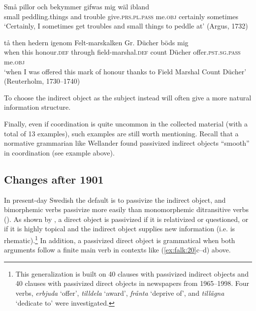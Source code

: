 \documentclass[output=paper]{langscibook}
\begin{document}
\ea%
    \label{ex:falk:26}

\ea
\gll Små  pillor          och  bekymmer  gifwas        mig    wäl ibland\\
      small  peddling.things  and  trouble     give.\textsc{prs.pl.pass}  me.\textsc{obj}  certainly              sometimes\\
\glt ‘Certainly, I sometimes get troubles and small things to peddle at’ (Argus, 1732)

\ex
\gll tå    then  hedern    igenom  Felt-marskalken    Gr.      Dücher böds            mig\\
when  this  honour.\textsc{def}  through  field-marshal.\textsc{def}    count    Dücher      offer.\textsc{pst.sg.pass}    me\textsc{.obj}\\
\glt ‘when I was offered this mark of honour thanks to Field Marshal Count Dücher’ (Reuterholm, 1730–1740)
\z
\z


To choose the indirect object as the subject instead will often give a more natural information structure.


Finally, even if coordination is quite uncommon in the collected material (with a total of 13 examples), such examples are still worth mentioning. Recall that a normative grammarian like Wellander found passivized indirect objects “smooth” in coordination (see example  above).


\subsection{Changes after 1901}\label{sec:falk:5.3}


In present-day Swedish the default is to passivize the indirect object, and bimorphemic verbs passivize more easily than monomorphemic ditransitive verbs (\citealt{HolmbergPlatzack1995,Lundquist2004,HaddicanHolmberg2019}). As shown by \citet{Lundquist2004}, a direct object is passivized if it is relativized or questioned, or if it is highly topical and the indirect object supplies new information (i.e. is rhematic).\footnote{This generalization is built on 40 clauses with passivized indirect objects and 40 clauses with passivized direct objects in newspapers from 1965–1998. Four verbs, \textit{erbjuda} ‘offer’, \textit{tilldela} ‘award’, \textit{frånta} ‘deprive of’, and \textit{tillägna} ‘dedicate to’ were investigated.} In addition, a passivized direct object is grammatical when both arguments follow a finite main verb in contexts like (\ref{ex:falk:20}c–d) above. 
\end{document}
